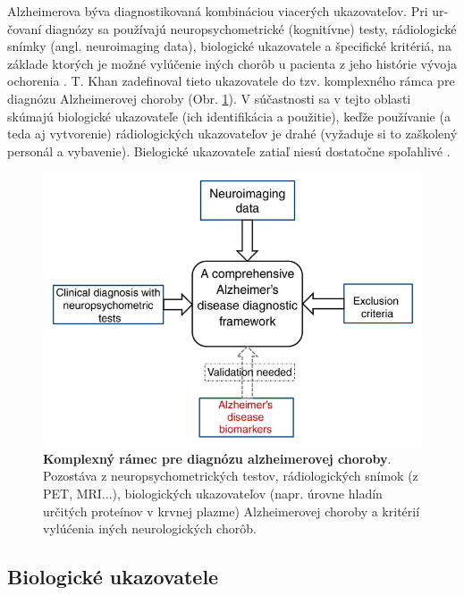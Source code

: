 Alzheimerova býva diagnostikovaná kombináciou viacerých ukazovateľov. Pri ur-čovaní diagnózy sa používajú neuropsychometrické (kognitívne) testy, rádiologické snímky (angl. neuroimaging data), biologické ukazovatele a špecifické kritériá, na základe ktorých je možné vylúčenie iných chorôb u pacienta z jeho histórie vývoja ochorenia \cite{khan2016biomarkers}. T. Khan zadefinoval tieto ukazovatele do tzv. komplexného rámca pre diagnózu Alzheimerovej choroby (Obr. \ref{fig:alzheimer_diagnosis_scheme}). V súčastnosti sa v tejto oblasti skúmajú biologické ukazovateľe (ich identifikácia a použitie), keďže používanie (a teda aj vytvorenie) rádiologických ukazovateľov je drahé \cite{khan2016biomarkers} (vyžaduje si to zaškolený personál a vybavenie). Bielogické ukazovateľe zatiaľ niesú dostatočne spoľahlivé \cite{khan2016biomarkers}.

\begin{figure}[h!]
\centering
\includegraphics[scale=0.35]{assets/images/alzhemier_diagnosis_scheme.png}
\caption{\textbf{Komplexný rámec pre diagnózu alzheimerovej choroby}. Pozostáva z neuropsychometrických testov, rádiologických snímok (z PET, MRI...), biologických ukazovateľov (napr. úrovne hladín určitých proteínov v krvnej plazme) Alzheimerovej choroby a kritérií vylúćenia iných neurologických chorôb.\cite{khan2016biomarkers}}
\label{fig:alzheimer_diagnosis_scheme}
\end{figure}

\subsection{Biologické ukazovatele}

